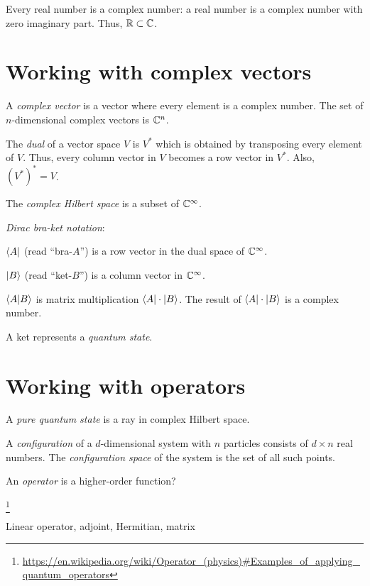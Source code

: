 Every real number is a complex number:
a real number is a complex number with zero imaginary part.
Thus, \( \mathbb{R} \subset \mathbb{C} \).

\section{Working with complex vectors}

A \emph{complex vector} is a vector where every element is a complex number.
The set of \(n\)-dimensional complex vectors is \(\mathbb{C}^n\).

The \emph{dual} of a vector space \(V\) is \(V^*\)
which is obtained by transposing every element of \(V\).
Thus, every column vector in \(V\) becomes a row vector in \(V^*\).
Also, \((V^*)^* = V\).

The \emph{complex Hilbert space} is a subset of \(\mathbb{C}^\infty\).

\emph{Dirac bra-ket notation}:

\(\bra{A}\) (read ``bra-\(A\)'') is a row vector in the dual space of \(\mathbb{C}^\infty\).

\(\ket{B}\) (read ``ket-\(B\)'') is a column vector in \(\mathbb{C}^\infty\).

\(\braket{A}{B}\) is matrix multiplication \(\bra{A} \cdot \ket{B}\).
The result of \(\bra{A} \cdot \ket{B}\) is a complex number.

A ket represents a \emph{quantum state}.

\section{Working with operators}

A \emph{pure quantum state} is a ray in complex Hilbert space.

A \emph{configuration} of a \(d\)-dimensional system with \(n\) particles consists of \(d \times n\) real numbers.
The \emph{configuration space} of the system is the set of all such points.

An \emph{operator} is a higher-order function?

\footnote{\url{https://en.wikipedia.org/wiki/Operator_(physics)\#Examples_of_applying_quantum_operators}}

Linear operator, adjoint, Hermitian, matrix


